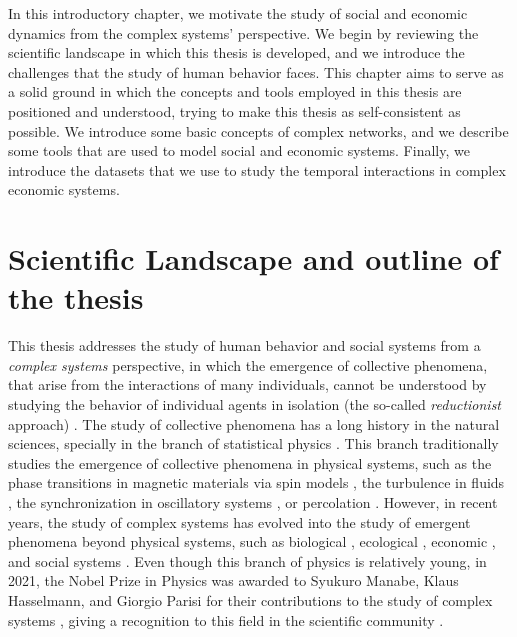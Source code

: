 In this introductory chapter, we motivate the study of social and economic dynamics from the complex systems' perspective. We begin by reviewing the scientific landscape in which this thesis is developed, and we introduce the challenges that the study of human behavior faces. This chapter aims to serve as a solid ground in which the concepts and tools employed in this thesis are positioned and understood, trying to make this thesis as self-consistent as possible. We introduce some basic concepts of complex networks, and we describe some tools that are used to model social and economic systems. Finally, we introduce the datasets that we use to study the temporal interactions in complex economic systems.

\section{\label{sec:scie_lands} Scientific Landscape and outline of the thesis}

This thesis addresses the study of human behavior and social systems from a \textit{complex systems} perspective, in which the emergence of collective phenomena, that arise from the interactions of many individuals, cannot be understood by studying the behavior of individual agents in isolation (the so-called \textit{reductionist} approach) \cite{anderson1972more}. The study of collective phenomena has a long history in the natural sciences, specially in the branch of statistical physics \cite{stanley1971phase}. This branch traditionally studies the emergence of collective phenomena in physical systems, such as the phase transitions in magnetic materials via spin models \cite{onsager-1944}, the turbulence in fluids \cite{frisch1995turbulence}, the synchronization in oscillatory systems \cite{pikovsky2001universal}, or percolation \cite{stauffer-1985}. However, in recent years, the study of complex systems has evolved into the study of emergent phenomena beyond physical systems, such as biological \cite{brown2000scaling,aderem-2005,alon2019introduction}, ecological \cite{may-2001}, economic \cite{limburg2002complex}, and social systems \cite{castellano2009statistical}. Even though this branch of physics is relatively young, in 2021, the Nobel Prize in Physics was awarded to Syukuro Manabe, Klaus Hasselmann, and Giorgio Parisi for their contributions to the study of complex systems \cite{nobel-2021}, giving a recognition to this field in the scientific community \cite{bianconi2023complex}.

